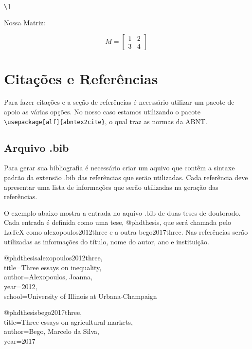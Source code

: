 \documentclass[12pt,oneside,a4paper,chapter=TITLE,english,brazil,sumario=abnt-6027-2012]{abntex2}
\begin{document}
\verb|\]|

\vspace{0.4cm}

Nossa Matriz:

\vspace{0.2cm}
\[
M=
\begin{bmatrix}
1 & 2  \\
3 & 4 
\end{bmatrix}
\]




\section{Citações e Referências}\label{citaebib}

{\tiny }

Para fazer citações e a seção de referências é necessário utilizar um pacote de apoio as várias opções. No nosso caso estamos utilizando o pacote \verb|\usepackage[alf]{abntex2cite}|, o qual traz as normas da ABNT.

\subsection{Arquivo .bib}

Para gerar sua bibliografia é necessário criar um aquivo que contêm a sintaxe padrão da extensão .bib das referências que serão utilizadas. Cada referência deve apresentar uma lista de informações que serão utilizadas na geração das referências. 

O exemplo abaixo mostra a entrada no aquivo .bib de duas teses de doutorado. Cada entrada é definida como uma tese, @phdthesis, que será chamada pelo {\LaTeX} como alexopoulos2012three e a outra bego2017three. Nas referências serão utilizadas as informações do título, nome do autor, ano e instituição.  

\vspace{1cm}
{
	\noindent
@phdthesis{alexopoulos2012three,\\
	title={Three essays on inequality},\\
	author={Alexopoulos, Joanna},\\
	year={2012},\\
	school={University of Illinois at Urbana-Champaign}\\
}
}

\vspace{1cm}
{
	\noindent
@phdthesis{bego2017three,\\
	title={Three essays on agricultural markets},\\
	author={Bego, Marcelo da Silva},\\
	year={2017}\\
}
}
\end{document}
